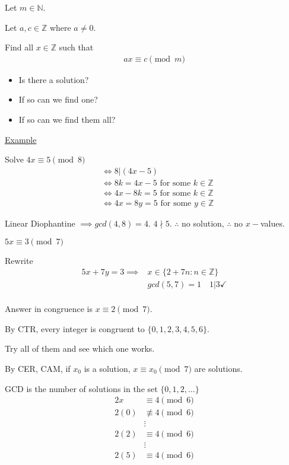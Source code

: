 \documentclass{article}
\begin{document}
Let $m \in \mathbb{N}$. 

Let $a,c \in \mathbb{Z}$ where $a \ne 0$. 

Find all $x \in \mathbb{Z}$ such that 
\begin{align*}
    ax \equiv c \pmod{m}
\end{align*}

\begin{itemize}
    \item Is there a solution?
    \item If so can we find one?
    \item If so can we find them all?
\end{itemize}

\underline{Example}

Solve $4x \equiv 5 \pmod{8}$
\begin{align*}
    &\iff 8 \vert (4x-5) \\
    &\iff 8k = 4x - 5 \text{ for some } k \in \mathbb{Z} \\
    &\iff 4x - 8k = 5 \text{ for some } k \in \mathbb{Z} \\
    &\iff 4x = 8y = 5 \text { for some } y \in \mathbb{Z}
\end{align*}

Linear Diophantine $\implies gcd(4,8) = 4$. $4 \nmid 5$. $\therefore$ no solution, $\therefore$ no $x-$values.

$5x \equiv 3 \pmod{7}$

Rewrite
\begin{align*}
    5x + 7y = 3 \implies &x \in \{2 + 7n: n \in \mathbb{Z}\}\\
    &gcd(5,7) = 1 \quad 1 \vert 3 \checkmark \\
\end{align*}

Answer in congruence is $x \equiv 2 \pmod{7}$.

By CTR, every integer is congruent to $\{0,1,2,3,4,5,6\}$.

Try all of them and see which one works. 

By CER, CAM, if $x_0$ is a solution, $x \equiv x_0 \pmod{7}$ are solutions.

GCD is the number of solutions in the set $\{0,1,2,\ldots\}$
\begin{align*}
    2x &\equiv 4 \pmod{6}\\
    2(0) &\not\equiv 4 \pmod{6}\\
    &\vdots\\
    2(2) &\equiv 4 \pmod{6}\\
    &\vdots\\
    2(5) &\equiv 4 \pmod{6}
\end{align*}
\end{document}
